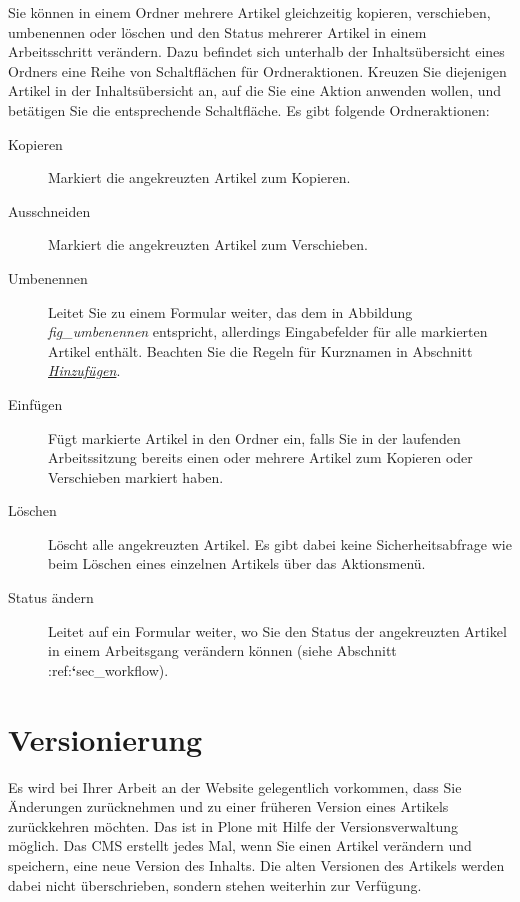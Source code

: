 \documentclass[a4paper,12pt,ngerman]{manual}
\begin{document}
Sie können in einem Ordner mehrere Artikel gleichzeitig kopieren,
verschieben, umbenennen oder löschen und den Status mehrerer Artikel
in einem Arbeitsschritt verändern. Dazu befindet sich unterhalb der
Inhaltsübersicht eines Ordners eine Reihe von Schaltflächen für
Ordneraktionen. Kreuzen Sie diejenigen Artikel in der Inhaltsübersicht
an, auf die Sie eine Aktion anwenden wollen, und betätigen Sie die
entsprechende Schaltfläche. Es gibt folgende Ordneraktionen:
\begin{description}
\item[Kopieren] \leavevmode
Markiert die angekreuzten Artikel zum Kopieren.

\item[Ausschneiden] \leavevmode
Markiert die angekreuzten Artikel zum Verschieben.

\item[Umbenennen] \leavevmode
Leitet Sie zu einem Formular weiter, das dem in
Abbildung \emph{fig\_umbenennen} entspricht, allerdings Eingabefelder für
alle markierten Artikel enthält. Beachten Sie die Regeln für Kurznamen in
Abschnitt \hyperlink{sec-artikel-erstellen}{\emph{Hinzufügen}}.

\item[Einfügen] \leavevmode
Fügt markierte Artikel in den Ordner ein, falls
Sie in der laufenden Arbeitssitzung bereits einen oder mehrere Artikel zum
Kopieren oder Verschieben markiert haben.

\item[Löschen] \leavevmode
Löscht alle angekreuzten Artikel. Es gibt dabei keine
Sicherheitsabfrage wie beim Löschen eines einzelnen Artikels über
das Aktionsmenü.

\item[Status ändern] \leavevmode
Leitet auf ein Formular weiter, wo Sie den Status der
angekreuzten Artikel in einem Arbeitsgang verändern können (siehe
Abschnitt :ref:{\color{red}\bfseries{}{}`}sec\_workflow).

\end{description}

\resetcurrentobjects
\hypertarget{--doc-umgang/undo}{}

\hypertarget{sec-undo}{}\section{Versionierung}

Es wird bei Ihrer Arbeit an der Website gelegentlich vorkommen, dass Sie
Änderungen zurücknehmen und zu einer früheren Version eines Artikels
zurückkehren möchten. Das ist in Plone mit Hilfe der Versionsverwaltung
möglich. Das CMS erstellt jedes Mal, wenn Sie einen Artikel verändern und
speichern, eine neue Version des Inhalts. Die alten Versionen des Artikels
werden dabei nicht überschrieben, sondern stehen weiterhin zur Verfügung.
\end{document}
